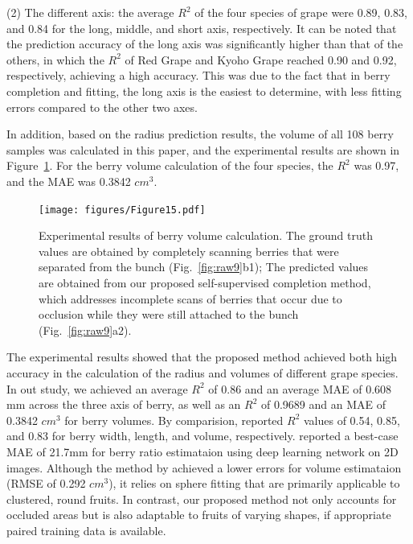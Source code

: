 \documentclass[12pt]{article}
\begin{document}
(2) The different axis: the average $R^2$ of the four species of grape were 0.89, 0.83, and 0.84 for the long, middle, and short axis, respectively. 
It can be noted that the prediction accuracy of the long axis was significantly higher than that of the others, in which the $R^2$ of Red Grape and Kyoho Grape reached 0.90 and 0.92, respectively, achieving a high accuracy. 
This was due to the fact that in berry completion and fitting, the long axis is the easiest to determine, with less fitting errors compared to the other two axes.

In addition, based on the radius prediction results, the volume of all 108 berry samples was calculated in this paper, and the experimental results are shown in Figure~\ref{fig:raw18}.
For the berry volume calculation of the four species, the $R^2$ was 0.97, and the MAE was 0.3842 $cm^3$.

\begin{figure}[hbt!]
    \centering
    \texttt{[image: figures/Figure15.pdf]}
    \caption{Experimental results of berry volume calculation. The ground truth values are obtained by completely scanning berries that were separated from the bunch (Fig.~\ref{fig:raw9}b1); The predicted values are obtained from our proposed self-supervised completion method, which addresses incomplete scans of berries that occur due to occlusion while they were still attached to the bunch (Fig.~\ref{fig:raw9}a2).}
    \label{fig:raw18}
\end{figure}

The experimental results showed that the proposed method achieved both high accuracy in the calculation of the radius and volumes of different grape species.
In out study, we achieved an average $R^2$ of 0.86 and an average MAE of 0.608 mm across the three axis of berry, as well as an $R^2$ of 0.9689 and an MAE of 0.3842 $cm^3$ for berry volumes.
By comparision, \citet[Fig.~4]{rist_highprecision_2018} reported $R^2$ values of 0.54, 0.85, and 0.83 for berry width, length, and volume, respectively.
\citet{botturi_stewie_2023} reported a best-case MAE of 21.7mm for berry ratio estimataion using deep learning network on 2D images.
Although the method by \citet{ni_threedimensional_2021} achieved a lower errors for volume estimataion (RMSE of 0.292 $cm^3$), it relies on sphere fitting that are primarily applicable to clustered, round fruits.
In contrast, our proposed method not only accounts for occluded areas but is also adaptable to fruits of varying shapes, if appropriate paired training data is available.
\end{document}
